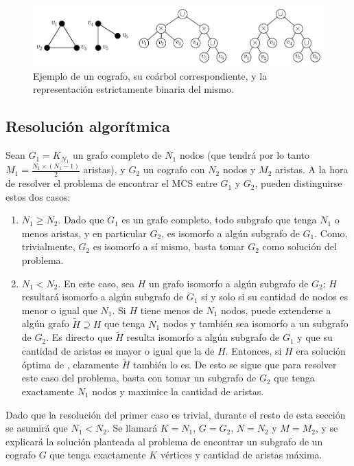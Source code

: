 \begin{figure}[htbp]
    \centering
    \includegraphics{imagenes/ex3_ejemplo-coarbol.pdf}
    \caption{Ejemplo de un cografo, su coárbol correspondiente, y la
    representación estrictamente binaria del mismo.}
    \label{fig:cografos:ejemplo-coarbol}
\end{figure}

\subsection{Resolución algorítmica}
Sean $G_1 = K_{N_1}$ un grafo completo de $N_1$ nodos (que tendrá por lo tanto
$M_1 = \frac{N_1 \times (N_1 - 1)}{2}$ aristas), y $G_2$ un cografo con $N_2$
nodos y $M_2$ aristas. A la hora de resolver el problema de encontrar el \acr
{MCS} entre $G_1$ y $G_2$, pueden distinguirse estos dos casos:
\begin{enumerate}
    \item $N_1 \geq N_2$. Dado que $G_1$ es un grafo completo, todo
    subgrafo que tenga $N_1$ o menos aristas, y en particular $G_2$,
    es isomorfo a algún subgrafo de $G_1$. Como, trivialmente, $G_2$ es
    isomorfo a sí mismo, basta tomar $G_2$ como solución del problema.
    \item $N_1 < N_2$. En este caso, sea $H$ un grafo isomorfo a algún
    subgrafo de $G_2$; $H$ resultará isomorfo a algún subgrafo de $G_1$ si
    y solo si su cantidad de nodos es menor o igual que $N_1$. Si $H$ tiene
    menos de $N_1$ nodos, puede extenderse a algún grafo $\tilde{H} \supseteq
    H$ que tenga $N_1$ nodos y también sea isomorfo a un subgrafo de $G_2$.
    Es directo que $\tilde{H}$ resulta isomorfo a algún subgrafo de $G_1$ y
    que su cantidad de aristas es mayor o igual que la de $H$. Entonces, si
    $H$ era solución óptima de , claramente $\tilde{H}$ también lo
    es. De esto se sigue que para resolver este caso del problema, basta con
    tomar un subgrafo de $G_2$ que tenga exactamente $N_1$ nodos y maximice la
    cantidad de aristas.
\end{enumerate}

Dado que la resolución del primer caso es trivial, durante el resto de esta
sección se asumirá que $N_1 < N_2$. Se llamará $K = N_1$, $G = G_2$, $N = N_2$
y $M = M_2$, y se explicará la solución planteada al problema de encontrar un
subgrafo de un cografo $G$ que tenga exactamente $K$ vértices y cantidad de
aristas máxima.

